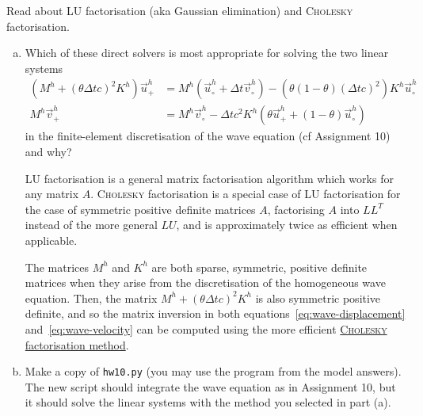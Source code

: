 Read about LU factorisation (aka Gaussian elimination) and \textsc{Cholesky} factorisation.
\begin{enumerate}[(a)]
\item Which of these direct solvers is most appropriate for solving the two linear systems
\begin{subequations}\label{eq:wave}
\begin{align}
\left(M^h + \left(\theta \Delta t c\right)^2 K^h\right) \vec{u}^h_+ &= M^h \left( \vec{u}^h_\circ + \Delta t \vec{v}^h_\circ\right) - \left( \theta\left(1-\theta\right) \left(\Delta t c\right)^2 \right)K^h \vec{u}^h_\circ\label{eq:wave-displacement}\\
M^h \vec{v}^h_+ &= M^h \vec{v}^h_\circ - \Delta t c^2 K^h \left( \theta \vec{u}^h_+ + \left(1-\theta\right) \vec{u}^h_\circ\right)\label{eq:wave-velocity}
\end{align}
\end{subequations}
in the finite-element discretisation of the wave equation (cf Assignment 10) and why?

\vspace{0.25cm}
\begin{solution}

LU factorisation is a general matrix factorisation algorithm which works for any matrix $A$. \textsc{Cholesky} factorisation is a special case of LU factorisation for the case of symmetric positive definite matrices $A$, factorising $A$ into $LL^T$ instead of the more general $LU$, and is approximately twice as efficient when applicable.

The matrices $M^h$ and $K^h$ are both sparse, symmetric, positive definite matrices when they arise from the discretisation of the homogeneous wave equation. Then, the matrix $M^h + \left(\theta \Delta t c\right)^2 K^h$ is also symmetric positive definite, and so the matrix inversion in both equations~\ref{eq:wave-displacement} and~\ref{eq:wave-velocity} can be computed using the more efficient \underline{\textsc{Cholesky} factorisation method}.

\end{solution}

\item Make a copy of \texttt{hw10.py} (you may use the program from the model answers). The new script should integrate the wave equation as in Assignment 10, but it should solve the linear systems with the method you selected in part (a).


\end{enumerate}
